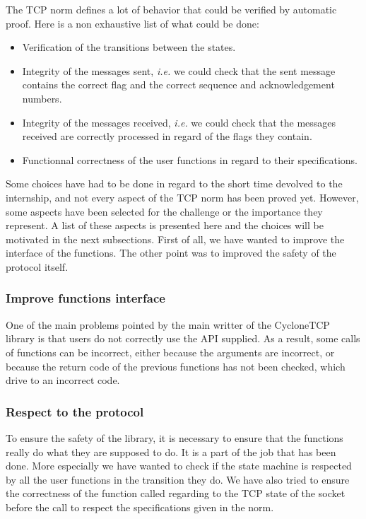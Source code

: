 \documentclass[a4paper, 10pt]{article}
\begin{document}
    The TCP norm defines a lot of behavior that could be verified by automatic proof.
    Here is a non exhaustive list of what could be done:
    \begin{itemize}
        \item Verification of the transitions between the states.
        \item Integrity of the messages sent, \textit{i.e.} we could check that the sent
        message contains the correct flag and the correct sequence and acknowledgement numbers.
        \item Integrity of the messages received, \textit{i.e.} we could check that the
        messages received are correctly processed in regard of the flags they contain.
        \item Functionnal correctness of the user functions in regard to their specifications.
    \end{itemize}

    Some choices have had to be done in regard to the short time devolved to the internship, and
    not every aspect of the TCP norm has been proved yet. However, some aspects have been selected
    for the challenge or the importance they represent. A list of these aspects is presented
    here and the choices will be motivated in the next subsections. First of all, we have wanted
    to improve the interface of the functions. The other point was to improved the safety of the
    protocol itself.

    \subsubsection{Improve functions interface}

    One of the main problems pointed by the main writter of the CycloneTCP library is that users
    do not correctly use the API supplied. As a result, some calls of
    functions can be incorrect, either because the arguments are incorrect, or because the
    return code of the previous functions has not been checked, which drive to an
    incorrect code.

    \subsubsection{Respect to the protocol}

    To ensure the safety of the library, it is necessary to ensure that the functions really
    do what they are supposed to do. It is a part of the job that has been done. More
    especially we have wanted to check if the state machine is respected by all the
    user functions in the transition they do. We have also tried to ensure the correctness
    of the function called regarding to the TCP state of the socket before the call
    to respect the specifications given in the norm.
\end{document}
